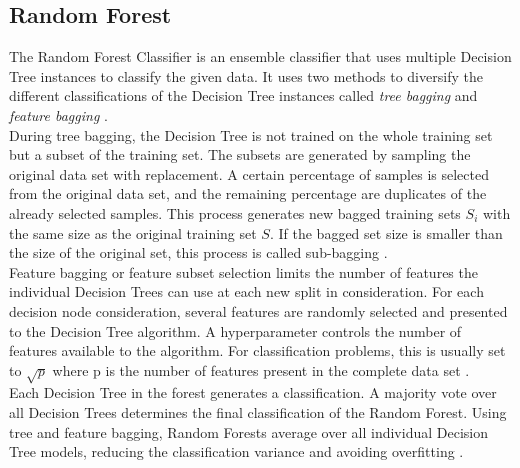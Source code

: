 \subsection{Random Forest}
The Random Forest Classifier is an ensemble classifier that uses multiple 
Decision Tree instances to classify the given data. It uses two methods to 
diversify the different classifications of the Decision Tree instances called 
\textit{tree bagging} and \textit{feature bagging} \cite{RN163}.
\\
During tree bagging, the Decision Tree is not trained on the whole training 
set but a subset of the training set. The subsets are generated by sampling 
the original data set with replacement. A certain percentage of samples 
is selected from the original data set, and the remaining 
percentage are duplicates of the already selected samples. This 
process generates new bagged training sets $S_i$ with the same size as the 
original training set $S$. If the bagged set size is smaller than the 
size of the original set, this process is called sub-bagging \cite{RN163, 
RN170}.
\\
Feature bagging or feature subset selection limits the number of features the 
individual Decision Trees can use at each new split in consideration. 
For each decision node consideration, several features are randomly 
selected and presented to the Decision Tree algorithm. A hyperparameter 
controls the number of features available to the algorithm. For 
classification problems, this is usually set to $\sqrt{p}$ where p is the 
number of features present in the complete data set \cite{RN163, RN166}.
\\
Each Decision Tree in the forest generates a classification. A majority vote 
over all Decision Trees determines the final classification of the Random 
Forest. Using tree and feature bagging, Random Forests average over 
all individual Decision Tree models, reducing the classification variance and 
avoiding overfitting \cite{RN166}.
